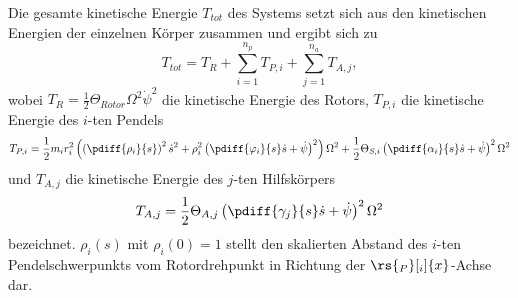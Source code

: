 Die gesamte kinetische Energie $T_{tot}$ des Systems setzt sich aus den kinetischen Energien der einzelnen Körper zusammen
und ergibt sich zu
%
%
\begin{equation}
	T_{tot} = T_R + \sum_{i=1}^{n_p} T_{P,i} + \sum_{j=1}^{n_a} T_{A,j},
\label{eq:GesamteKinetischeEnergieTtot}
\end{equation}
%
%
%
wobei $T_R = \frac{1}{2}\Theta_{Rotor} \Omega^2 \dot{\psi}^2$ die kinetische Energie des Rotors, 
$T_{P,i}$ die kinetische Energie des $i$-ten Pendels 
\begin{equation}
	T_{P,i} = \frac{1}{2} m_i r_i^2 \left( \left(\pdiff{\rho_i}{s}\right)^2 \dot{s}^2 + \rho_i^2 \left(\pdiff{\varphi_i}{s}\dot{s}+\dot{\psi}\right)^2 \right) \Omega^2 
						+ \frac{1}{2} \Theta_{S,i} \left( \pdiff{\alpha_i}{s}\dot{s} + \dot{\psi} \right)^2 \Omega^2
\label{eq:KinetischeEnergiePendel}
\end{equation}
und $T_{A,j}$ die kinetische Energie des $j$-ten Hilfskörpers 
\begin{equation}
	T_{A,j} = \frac{1}{2} \Theta_{A,j} \left( \pdiff{\gamma_j}{s}\dot{s} + \dot{\psi} \right)^2 \Omega^2
\label{eq:KinetischeEnergieAuxiliaryBody}
\end{equation}
bezeichnet. $\rho_i (s)$ mit $\rho_i (0) = 1$ stellt den skalierten Abstand des $i$-ten Pendelschwerpunkts 
vom Rotordrehpunkt in Richtung der $\rs{_P}[_i]{x}$-Achse dar.
%
%
%
%
%
%
